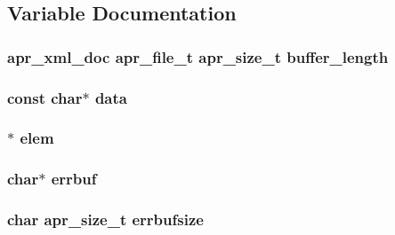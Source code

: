 \subsection{Variable Documentation}
\subsubsection[{\texorpdfstring{buffer\+\_\+length}{buffer_length}}]{ {\bf apr\+\_\+xml\+\_\+doc} {\bf apr\+\_\+file\+\_\+t} {\bf apr\+\_\+size\+\_\+t} buffer\+\_\+length}\hypertarget{group__APR__Util__XML_gaebde593fb462b2b88e317e0ec5f0131e}{}\label{group__APR__Util__XML_gaebde593fb462b2b88e317e0ec5f0131e}
\subsubsection[{\texorpdfstring{data}{data}}]{\setlength{\rightskip}{0pt plus 5cm}const char$\ast$ {\bf data}}\hypertarget{group__APR__Util__XML_ga8f64897c7ccc5c13f276d1d07c4e7095}{}\label{group__APR__Util__XML_ga8f64897c7ccc5c13f276d1d07c4e7095}
\subsubsection[{\texorpdfstring{elem}{elem}}]{$\ast$ {\bf elem}}\hypertarget{group__APR__Util__XML_gae64b560d80e0a044b095bfc01b7fed59}{}\label{group__APR__Util__XML_gae64b560d80e0a044b095bfc01b7fed59}
\subsubsection[{\texorpdfstring{errbuf}{errbuf}}]{\setlength{\rightskip}{0pt plus 5cm}char$\ast$ errbuf}\hypertarget{group__APR__Util__XML_ga844ffb41af9cf83add741994874afb59}{}\label{group__APR__Util__XML_ga844ffb41af9cf83add741994874afb59}
\subsubsection[{\texorpdfstring{errbufsize}{errbufsize}}]{\setlength{\rightskip}{0pt plus 5cm}char {\bf apr\+\_\+size\+\_\+t} errbufsize}\hypertarget{group__APR__Util__XML_gab934f5bfb716b96bcbbc8328eb4c91a0}{}\label{group__APR__Util__XML_gab934f5bfb716b96bcbbc8328eb4c91a0}
